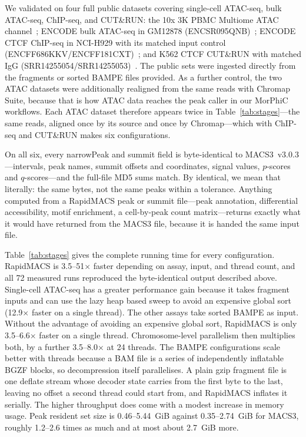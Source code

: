 \documentclass[namedate,webpdf,contemporary,large]{oup-authoring-template}
\begin{document}
We validated on four full public datasets covering single-cell ATAC-seq, bulk ATAC-seq, ChIP-seq, and CUT\&RUN: the 10x 3K PBMC Multiome ATAC channel~\citep{tenx_pbmc3k_multiome}; ENCODE bulk ATAC-seq in GM12878 (ENCSR095QNB)~\citep{encode_atac_gm12878}; ENCODE CTCF ChIP-seq in NCI-H929 with its matched input control (ENCFF686KKV/\allowbreak ENCFF181CXT)~\citep{encode_ctcf_h929}; and K562 CTCF CUT\&RUN with matched IgG (SRR14255054/\allowbreak SRR14255053)~\citep{ng_mynrl15_cutrun}. The public sets were ingested directly from the fragments or sorted BAMPE files provided. As a further control, the two ATAC datasets were additionally realigned from the same reads with Chromap Suite, because that is how ATAC data reaches the peak caller in our MorPhiC workflows. Each ATAC dataset therefore appears twice in Table~\ref{tab:stages}---the same reads, aligned once by its source and once by Chromap---which with ChIP-seq and CUT\&RUN makes six configurations.

On all six, every narrowPeak and summit field is byte-identical to MACS3~v3.0.3---intervals, peak names, summit offsets and coordinates, signal values, $p$-scores and $q$-scores---and the full-file MD5 sums match. By identical, we mean that literally:
the same bytes, not the same peaks within a tolerance. Anything computed from a RapidMACS peak or summit file---peak annotation, differential accessibility, motif enrichment, a cell-by-peak count matrix---returns exactly what it would have returned from the MACS3 file, because it is handed the same input file.

Table~\ref{tab:stages} gives the complete running time for every configuration. RapidMACS is 3.5--51$\times$ faster depending on assay, input, and thread count, and all 72 measured runs reproduced the byte-identical output described above. Single-cell ATAC-seq has a greater performance gain because it takes fragment inputs and can use the lazy heap based sweep to avoid an expensive global sort (12.9$\times$ faster on a single thread). The other assays take sorted BAMPE as input. Without the advantage of avoiding an expensive global sort, RapidMACS is only 3.5--6.6$\times$ faster on a single thread. Chromosome-level parallelism then multiplies both, by a further 3.5--8.0$\times$ at 24 threads. The BAMPE configurations scale better with threads because a BAM file is a series of independently inflatable BGZF blocks, so decompression itself parallelises. A plain gzip fragment file is one deflate stream whose decoder state carries from the first byte to the last, leaving no offset a second thread could start from, and RapidMACS inflates it serially. The higher throughput does come with a modest increase in memory usage. Peak resident set size is 0.46--5.44~GiB against 0.35--2.74~GiB for MACS3, roughly 1.2--2.6 times as much and at most about 2.7~GiB more.
\end{document}
